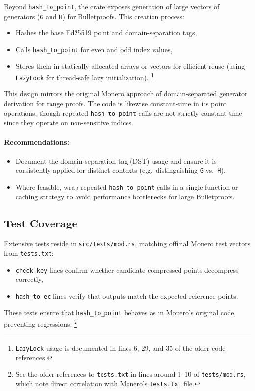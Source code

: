 \documentclass[12pt,a4paper]{article}
\begin{document}
Beyond \texttt{hash\_to\_point}, the crate exposes generation of large vectors of generators (\texttt{G} and \texttt{H}) for Bulletproofs. 
This creation process:
\begin{itemize}
    \item Hashes the base Ed25519 point and domain-separation tags,
    \item Calls \texttt{hash\_to\_point} for even and odd index values,
    \item Stores them in statically allocated arrays or vectors for efficient reuse (using \texttt{LazyLock} for thread-safe lazy initialization).%
    \footnote{\texttt{LazyLock} usage is documented in lines 6, 29, and 35 of the older code references.}
\end{itemize}
This design mirrors the original Monero approach of domain-separated generator derivation for range proofs. 
The code is likewise constant-time in its point operations, though repeated \texttt{hash\_to\_point} calls are not strictly constant-time since they operate on non-sensitive indices.

\paragraph{Recommendations:}
\begin{itemize}
    \item Document the domain separation tag (DST) usage and ensure it is consistently applied for distinct contexts (e.g.\ distinguishing \texttt{G} vs.\ \texttt{H}).
    \item Where feasible, wrap repeated \texttt{hash\_to\_point} calls in a single function or caching strategy to avoid performance bottlenecks for large Bulletproofs.
\end{itemize}

\subsection{Test Coverage}

Extensive tests reside in \texttt{src/tests/mod.rs}, matching official Monero test vectors from \texttt{tests.txt}:
\begin{itemize}
    \item \texttt{check\_key} lines confirm whether candidate compressed points decompress correctly,
    \item \texttt{hash\_to\_ec} lines verify that outputs match the expected reference points.
\end{itemize}
These tests ensure that \texttt{hash\_to\_point} behaves as in Monero’s original code, preventing regressions.%
\footnote{See the older references to \texttt{tests.txt} in lines around 1--10 of \texttt{tests/mod.rs}, which note direct correlation with Monero’s \texttt{tests.txt} file.}
\end{document}
